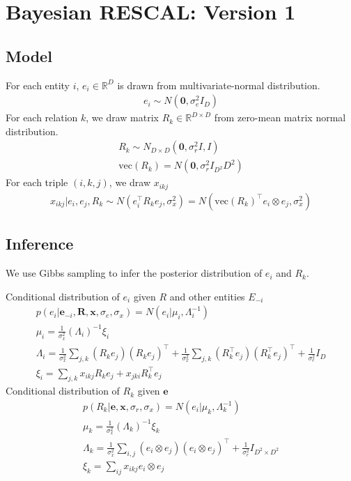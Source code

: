 \documentclass{article}
\theoremstyle{definition}
\begin{document}
 
\section{Bayesian RESCAL: Version 1}
\subsection{Model}

For each entity $i$, $e_i \in \mathbb{R}^{D}$ is drawn from multivariate-normal distribution.
\begin{align}
e_i \sim {N}(\mathbf{0}, \sigma_e^2{I}_D)
\end{align}
For each relation $k$, we draw matrix $R_k \in \mathbb{R}^{D\times D}$ from zero-mean matrix normal distribution.
\begin{align}
R_k \sim {N}_{D \times D}(\mathbf{0}, \sigma_r^2{I}, {I}) \\
\text{vec}(R_k) = N(\mathbf{0}, \sigma_r^2 I_{D^2}{D^2})
\end{align}
For each triple $(i,k,j)$, we draw $x_{ikj}$ 
\begin{align}
x_{ikj} |e_i, e_j, R_k \sim N(e_i^{\top} R_k e_j, \sigma_x^2) = N(\text{vec}(R_k)^{\top} e_i \otimes e_j, \sigma_x^2)
\end{align}

\subsection{Inference}
We use Gibbs sampling to infer the posterior distribution of $e_i$ and $R_k$.

Conditional distribution of $e_i$ given $R$ and other entities $E_{-i}$
\begin{align}
p(e_i |\mathbf{e}_{-i}, \mathbf{R}, \mathbf{x}, \sigma_e, \sigma_x) = N(e_i | \mu_i, \Lambda_i^{-1})\\
\mu_i = \frac{1}{\sigma_x^2}(\Lambda_i)^{-1}\xi_i \\
\Lambda_i = \frac{1}{\sigma_x^2} \sum_{j,k} (R_k e_j)(R_k e_j)^\top + \frac{1}{\sigma_x^2} \sum_{j,k} (R_k^\top e_j)(R_k^\top e_j)^\top+ \frac{1}{\sigma_e^2} {I}_D\\
\xi_i = \sum_{j,k} x_{ikj} R_{k} e_{j} + x_{jki} R_{k}^\top e_{j}
\end{align}
Conditional distribution of $R_k$ given $\mathbf{e}$
\begin{align}
p(R_k|\mathbf{e}, \mathbf{x}, \sigma_r, \sigma_x)  = N(e_i | \mu_k, \Lambda_k^{-1})\\
\mu_k = \frac{1}{\sigma_x^2}(\Lambda_k)^{-1}\xi_k \\
\Lambda_k = \frac{1}{\sigma_x^2} \sum_{i,j} (e_i \otimes e_j)(e_i \otimes e_j)^\top + \frac{1}{\sigma_r^2} {I}_{D^2 \times D^2}\\
\xi_k = \sum_{ij} x_{ikj} e_{i} \otimes e_{j}
\end{align}



\end{document}
